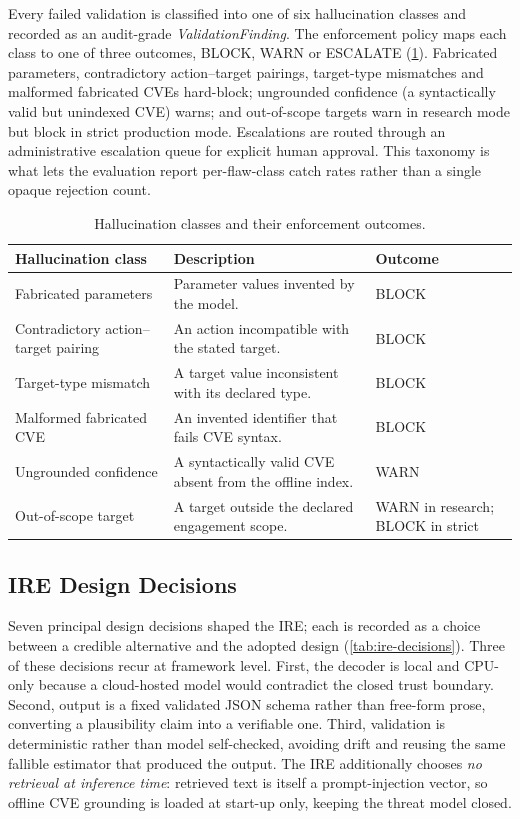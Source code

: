 Every failed validation is classified into one of six hallucination classes and
recorded as an audit-grade \emph{ValidationFinding}. The enforcement policy maps
each class to one of three outcomes, BLOCK, WARN or ESCALATE
(\cref{tab:ire-hallucination}). Fabricated parameters, contradictory
action--target pairings, target-type mismatches and malformed fabricated CVEs
hard-block; ungrounded confidence (a syntactically valid but unindexed CVE)
warns; and out-of-scope targets warn in research mode but block in strict
production mode. Escalations are routed through an administrative escalation
queue for explicit human approval. This taxonomy is what lets the evaluation
report per-flaw-class catch rates rather than a single opaque rejection count.

\begin{table}[htbp]
  \centering
  \begin{tabular}{@{}p{}p{}p{}@{}}
    \toprule
    \textbf{Hallucination class} & \textbf{Description} & \textbf{Outcome}\\
    \midrule
    Fabricated parameters & Parameter values invented by the model. & BLOCK\\
    Contradictory action--target pairing & An action incompatible with the stated target. & BLOCK\\
    Target-type mismatch & A target value inconsistent with its declared type. & BLOCK\\
    Malformed fabricated CVE & An invented identifier that fails CVE syntax. & BLOCK\\
    Ungrounded confidence & A syntactically valid CVE absent from the offline index. & WARN\\
    Out-of-scope target & A target outside the declared engagement scope. & WARN in research; BLOCK in strict\\
    \bottomrule
  \end{tabular}
  \caption{Hallucination classes and their enforcement outcomes.}\label{tab:ire-hallucination}
\end{table}

\subsection{IRE Design Decisions}\label{sec:method-ire-decisions}

Seven principal design decisions shaped the IRE; each is recorded as a choice
between a credible alternative and the adopted design
(\cref{tab:ire-decisions}). Three of these decisions recur at framework level.
First, the decoder is local and CPU-only because a cloud-hosted model would
contradict the closed trust boundary. Second, output is a fixed validated JSON
schema rather than free-form prose, converting a plausibility claim into a
verifiable one. Third, validation is deterministic rather than model self-checked,
avoiding drift and reusing the same fallible estimator that produced the output.
The IRE additionally chooses \emph{no retrieval at inference time}: retrieved
text is itself a prompt-injection vector, so offline CVE grounding is loaded at
start-up only, keeping the threat model closed.

